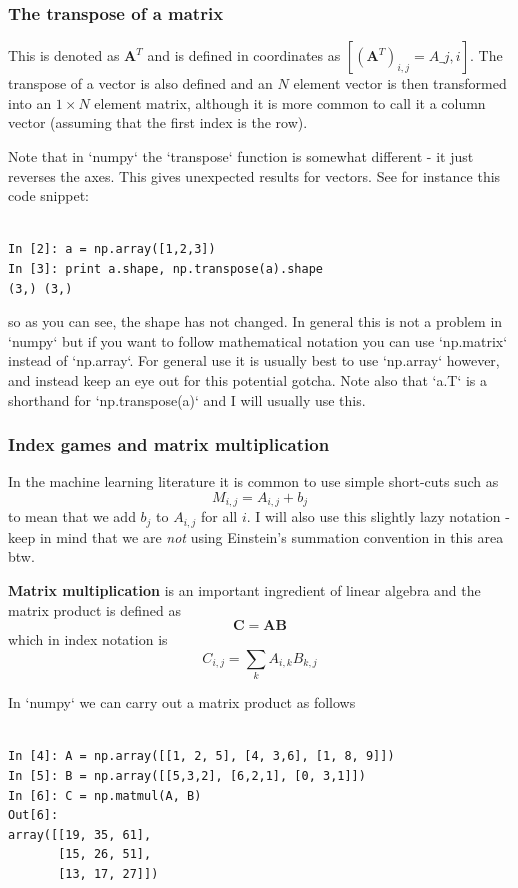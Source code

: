\documentclass[a4paper,10pt]{article}
\begin{document}
\subsubsection{ The transpose of a matrix}

This is denoted as $\mathbf{A}^T$ and is defined in coordinates as $ [ \left(\mathbf{A}^{T}\right)_{i, j} = {A}\_{j, i} ] $. The transpose of a vector is also defined and an $N$ element vector is then transformed into an $1\times N$ element matrix, although it is more common to call it a column vector (assuming that the first index is the row).

Note that in `numpy` the `transpose` function is somewhat different - it just reverses the axes. This gives unexpected results for vectors. See for instance this code snippet:
\begin{lstlisting}

In [2]: a = np.array([1,2,3])
In [3]: print a.shape, np.transpose(a).shape
(3,) (3,)
\end{lstlisting}

so as you can see, the shape has not changed. In general this is not a problem in `numpy` but if you want to follow mathematical notation you can use `np.matrix` instead of `np.array`. For general use it is usually best to use `np.array` however, and instead keep an eye out for this potential gotcha.  Note also that `a.T` is a shorthand for `np.transpose(a)` and I will usually use this.


\subsubsection{ Index games and matrix multiplication}

In the machine learning literature it is common to use simple short-cuts such as
$$M_{i,j} = A_{i,j} + b_{j}$$
to mean that we add $b_j$ to $A_{i,j}$ for all $i$. I will also use this slightly lazy notation - keep in mind that we are \textit{not} using Einstein's summation convention in this area btw.

\textbf{Matrix multiplication} is an important ingredient of linear algebra and the matrix product is defined as
$$\mathbf{C} = \mathbf{A}\mathbf{B}$$
which in index notation is
$$C_{i,j} = \sum_k A_{i,k} B_{k, j}$$

In `numpy` we can carry out a matrix product as follows
\begin{lstlisting}

In [4]: A = np.array([[1, 2, 5], [4, 3,6], [1, 8, 9]])
In [5]: B = np.array([[5,3,2], [6,2,1], [0, 3,1]])
In [6]: C = np.matmul(A, B)
Out[6]: 
array([[19, 35, 61],
       [15, 26, 51],
       [13, 17, 27]])
\end{lstlisting}
\end{document}
